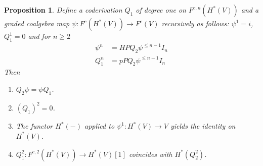 \documentclass{amsart}
\numberwithin{equation}{section}
\newtheorem{propositions}[lemmas]{Proposition}
\theoremstyle{definition}
\theoremstyle{remark}
\begin{document}
\begin{propositions}
\label{ref-A.2.1-47}
 Define a coderivation $Q_1$ of degree one on
$F^{c,n}(H^\ast(V))$ and a graded  coalgebra
map $\psi:F^c(H^\ast(V))\rightarrow F^c(V)$ recursively as follows: $\psi^1=i$,
$Q^1_1=0$ and for $n\ge 2$
\begin{equation}
\label{ref-A.5-48}
\begin{aligned}
\psi^n&=HPQ_2\psi^{\le n-1}I_n\\
Q^n_1&=pPQ_2\psi^{\le n-1}I_n
\end{aligned}
\end{equation}
Then
\begin{enumerate}
\item $Q_2\psi=\psi Q_1$. 
\item $(Q_1)^2=0$.
\item The functor $H^\ast(-)$ applied to  $\psi^1:H^\ast(V)\rightarrow V$ 
yields the identity on $H^\ast(V)$.
\item $Q_1^2:F^{c,2}(H^\ast(V))\rightarrow H^\ast(V)[1]$ coincides with $H^\ast(Q_2^2)$.
\end{enumerate}
\end{propositions}
\end{document}
